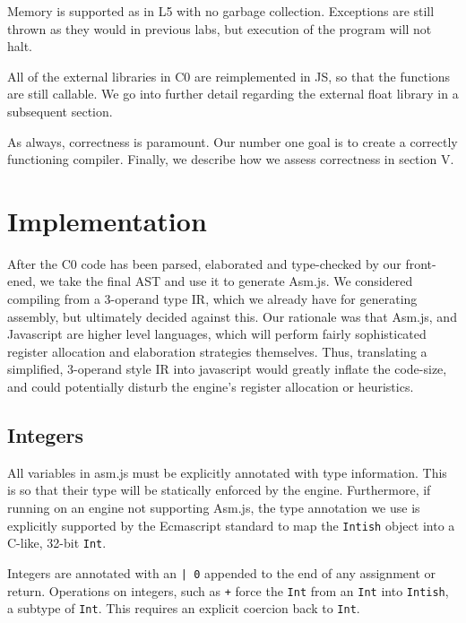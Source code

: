 \documentclass[twoside]{article}
\begin{document}
\begin{multicols}{2}
  Memory is supported as in L5 with no garbage collection. Exceptions are
  still thrown as they would in previous labs, but execution of the program
  will not halt.

  All of the external libraries in C0 are reimplemented in JS, so that the functions
  are still callable. We go into further detail regarding the external float library
  in a subsequent section. 

As always, correctness is paramount. Our number one goal is to create a correctly
functioning compiler. Finally, we describe how we assess correctness in section V. 


\section{Implementation}

  After the C0 code has been parsed, elaborated and type-checked by our 
  front-ened, we take the final AST and use it to generate Asm.js. We considered
  compiling from a 3-operand type IR, which we already have for generating assembly,
  but ultimately decided against this. Our rationale was that Asm.js, and Javascript
  are higher level languages, which will perform fairly sophisticated register allocation
  and elaboration strategies themselves. Thus, translating a simplified, 3-operand 
  style IR into javascript would greatly inflate the code-size, and could potentially
  disturb the engine's register allocation or heuristics. 

  \subsection{Integers}
    All variables in asm.js must be explicitly annotated with type information.
    This is so that their type will be statically enforced by the engine. Furthermore,
    if running on an engine not supporting Asm.js, the type annotation we use is 
    explicitly supported by the Ecmascript standard to map the \texttt{Intish} object
    into a C-like, 32-bit \texttt{Int}.  

    Integers are annotated with an \texttt{| 0} appended to the end of any
    assignment or return. Operations on integers, such as \texttt{+} force
    the \texttt{Int} from an \texttt{Int} into \texttt{Intish}, a subtype of \texttt{Int}. 
    This requires an explicit coercion back to \texttt{Int}.


\end{multicols}
\end{document}
